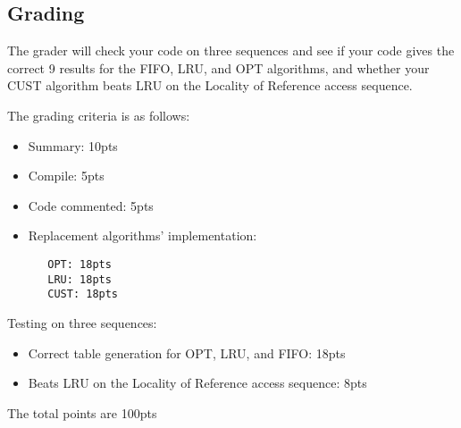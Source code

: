 \documentclass[letterpaper,10pt]{article}
\begin{document}
\subsection{Grading}
The grader will check your code on three sequences and see if your code gives the correct 9
results for the FIFO, LRU, and OPT algorithms, and whether your CUST algorithm beats LRU on
the Locality of Reference access sequence.

The grading criteria is as follows:

\begin{itemize}
\item Summary: 10pts
\item Compile: 5pts
\item Code commented: 5pts
\item Replacement algorithms' implementation:
\begin{verbatim}
   OPT: 18pts
   LRU: 18pts
   CUST: 18pts
\end{verbatim}
\end{itemize}

Testing on three sequences:
\begin{itemize}
\item Correct table generation for OPT, LRU, and FIFO: 18pts
\item Beats LRU on the Locality of Reference access sequence: 8pts
\end{itemize}

The total points are 100pts
\end{document}
